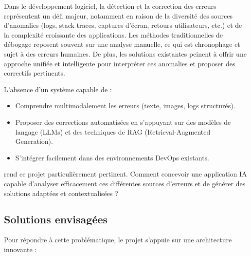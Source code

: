 \documentclass[12pt,a4paper]{report}
\begin{document}
	Dans le développement logiciel, la détection et la correction des erreurs représentent un défi majeur, notamment en raison de la diversité des sources d’anomalies (logs, stack traces, captures d’écran, retours utilisateurs, etc.) et de la complexité croissante des applications. Les méthodes traditionnelles de débogage reposent souvent sur une analyse manuelle, ce qui est chronophage et sujet à des erreurs humaines. De plus, les solutions existantes peinent à offrir une approche unifiée et intelligente pour interpréter ces anomalies et proposer des correctifs pertinents.
	
	L’absence d’un système capable de :
	
	\begin{itemize}
		\item Comprendre multimodalement les erreurs (texte, images, logs structurés).
		
		\item Proposer des corrections automatisées en s’appuyant sur des modèles de langage (LLMs) et des techniques de RAG (Retrieval-Augmented Generation).
		
		\item S’intégrer facilement dans des environnements DevOps existants.
	\end{itemize}
	
	rend ce projet particulièrement pertinent. Comment concevoir une application IA capable d’analyser efficacement ces différentes sources d’erreurs et de générer des solutions adaptées et contextualisées ?
	
	\subsection{Solutions envisagées}
	
	Pour répondre à cette problématique, le projet s’appuie sur une architecture innovante :
	
\end{document}
